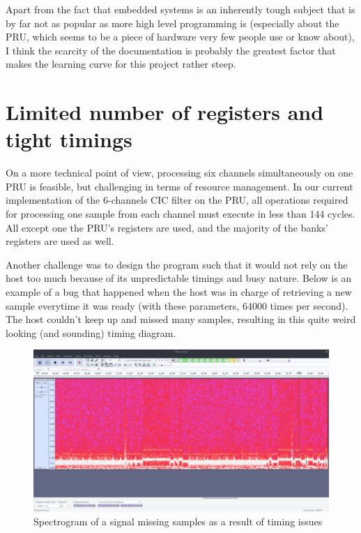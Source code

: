\documentclass[]{report}
\begin{document}
Apart from the fact that embedded systems is an inherently tough subject
that is by far not as popular as more high level programming is
(especially about the PRU, which seems to be a piece of hardware very
few people use or know about), I think the scarcity of the documentation
is probably the greatest factor that makes the learning curve for this
project rather steep.

\hypertarget{limited-number-of-registers-and-tight-timings}{%
\section{Limited number of registers and tight
timings}\label{limited-number-of-registers-and-tight-timings}}

On a more technical point of view, processing six channels
simultaneously on one PRU is feasible, but challenging in terms of
resource management. In our current implementation of the 6-channels CIC
filter on the PRU, all operations required for processing one sample
from each channel must execute in less than 144 cycles. All except one
the PRU's registers are used, and the majority of the banks' registers
are used as well.

Another challenge was to design the program such that it would not rely
on the host too much because of its unpredictable timings and busy
nature. Below is an example of a bug that happened when the host was in
charge of retrieving a new sample everytime it was ready (with these
parameters, 64000 times per second). The host couldn't keep up and
missed many samples, resulting in this quite weird looking (and
sounding) timing diagram.

\begin{figure}[h]
\centering
\includegraphics[width=1.0\linewidth]{Pictures/timing_bug.png}
\caption{Spectrogram of a signal missing samples as a result of timing
issues}
\end{figure}
\end{document}

